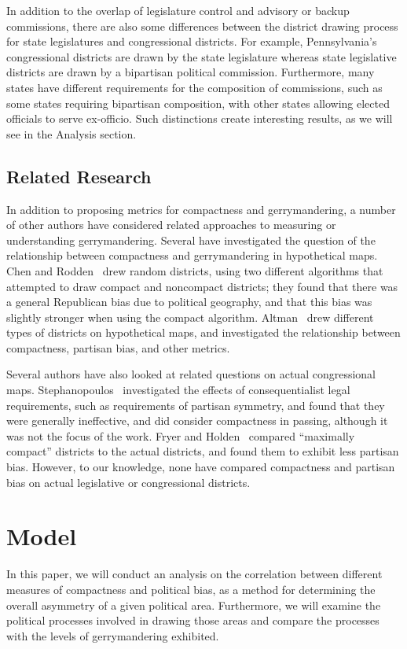 \documentclass[12pt]{article}
\begin{document}
In addition to the overlap of legislature control and advisory or backup commissions, there are also some differences between the district drawing process for state legislatures and congressional districts.  For example, Pennsylvania's congressional districts are drawn by the state legislature whereas state legislative districts are drawn by a bipartisan political commission.  Furthermore, many states have different requirements for the composition of commissions, such as some states requiring bipartisan composition, with other states allowing elected officials to serve ex-officio.  Such distinctions create interesting results, as we will see in the Analysis section.

\subsection{Related Research}

In addition to proposing metrics for compactness and gerrymandering, a number of other authors have considered related approaches to measuring or understanding gerrymandering.  Several have investigated the question of the relationship between compactness and gerrymandering in hypothetical maps.  Chen and Rodden~\cite{chenrodden} drew random districts, using two different algorithms that attempted to draw compact and noncompact districts; they found that there was a general Republican bias due to political geography, and that this bias was slightly stronger when using the compact algorithm.  Altman~\cite{altman} drew different types of districts on hypothetical maps, and investigated the relationship between compactness, partisan bias, and other metrics.

Several authors have also looked at related questions on actual congressional maps.  Stephanopoulos~\cite{stephanopoulos2} investigated the effects of consequentialist legal requirements, such as requirements of partisan symmetry, and found that they were generally ineffective, and did consider compactness in passing, although it was not the focus of the work.  Fryer and Holden~\cite{fryer} compared ``maximally compact'' districts to the actual districts, and found them to exhibit less partisan bias.  However, to our knowledge, none have compared compactness and partisan bias on actual legislative or congressional districts.

  \section{Model}
  In this paper, we will conduct an analysis on the correlation between different measures of compactness and political bias, as a method for determining the overall asymmetry of a given political area.  Furthermore, we will examine the political processes involved in drawing those areas and compare the processes with the levels of gerrymandering exhibited.
\end{document}
